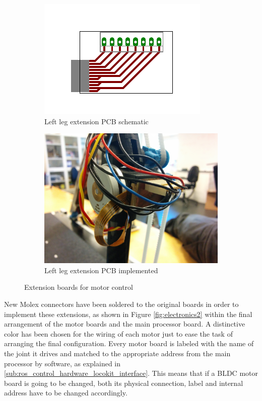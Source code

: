 \begin{figure}[ht]
\label{fig:pcbs}
\centering
	\begin{subfigure}[b]{0.5\textwidth}
		\includegraphics[width=\textwidth]{figures/expansion_board.pdf}
		\caption{Left leg extension PCB schematic}
		\label{fig:pcb1}
	\end{subfigure}
	\begin{subfigure}[b]{0.4\textwidth}
		\includegraphics[width=\textwidth]{figures/photo_electronics_detail.jpg}
		\caption{Left leg extension PCB implemented}
		\label{fig:pcb2}
	\end{subfigure}
	\caption{Extension boards for motor control}
\end{figure}

New Molex connectors have been soldered to the original boards in order to implement these extensions, as shown in Figure \ref{fig:electronics2} within the final arrangement of the motor boards and the main processor board.
A distinctive color has been chosen for the wiring of each motor just to ease the task of arranging the final configuration.
Every motor board is labeled with the name of the joint it drives and matched to the appropriate address from the main processor by software, as explained in \ref{sub:ros_control_hardware_locokit_interface}.
This means that if a BLDC motor board is going to be changed, both its physical connection, label and internal address have to be changed accordingly.

